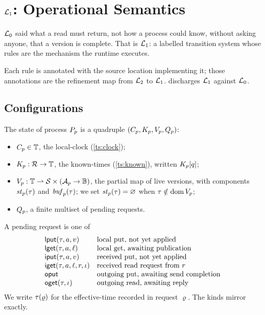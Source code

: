 \section{\texorpdfstring{$\mathcal{L}_1$}{L1}: Operational Semantics}
\label{sec:l1}

$\mathcal{L}_0$ said what a read must return, not how a process could know, without
asking anyone, that a version is complete. That is $\mathcal{L}_1$: a labelled
transition system whose rules are the mechanism the runtime executes.

Each rule is annotated with the source location implementing it; those
annotations are the refinement map from $\mathcal{L}_2$ to $\mathcal{L}_1$.
 discharges $\mathcal{L}_1$ against $\mathcal{L}_0$.

\subsection{Configurations}
\label{sec:l1-config}

\begin{definition}\label{def:local-state}
The state of process $P_{p}$ is a quadruple $(C_{p}, K_p, V_{p}, Q_{p})$:
\begin{itemize}[leftmargin=1.5em,itemsep=1pt]
  \item $C_{p} \in \mathbb{T}$, the \gls{local-clock} (\cref{ts:clock});
  \item $K_p : \mathcal{R} \to \mathbb{T}$, the \glspl{known-time} (\cref{ts:known}), written
    $K_{p}[q]$;
  \item $V_{p} : \mathbb{T} \rightharpoonup \mathcal{S} \times (\mathcal{A}_{p} \to \mathbb{B})$, the
    partial map of live \glspl{version}, with components $\mathit{st}_{p}(\tau)$ and
    $\mathit{buf}_{p}(\tau)$; we set $\mathit{st}_{p}(\tau) = \varnothing$ when
    $\tau \notin \operatorname{dom} V_{p}$;
  \item $Q_{p}$, a finite multiset of pending requests.
\end{itemize}
\end{definition}

\begin{definition}[Requests]\label{def:requests}
A pending request is one of
\[
\begin{array}{ll}
  \mathsf{lput}(\tau, a, v)            & \text{local put, not yet applied}\\
  \mathsf{lget}(\tau, a, \ell)         & \text{local get, awaiting publication}\\
  \mathsf{iput}(\tau, a, v)            & \text{received put, not yet applied}\\
  \mathsf{iget}(\tau, a, \ell, r, \iota) & \text{received read request from } r\\
  \mathsf{oput}                        & \text{outgoing put, awaiting send completion}\\
  \mathsf{oget}(\tau, \iota)           & \text{outgoing read, awaiting reply}
\end{array}
\]
We write $\tau(\varrho)$ for the \gls{effective-time} recorded in request
$\varrho$. The kinds mirror  exactly.
\end{definition}


